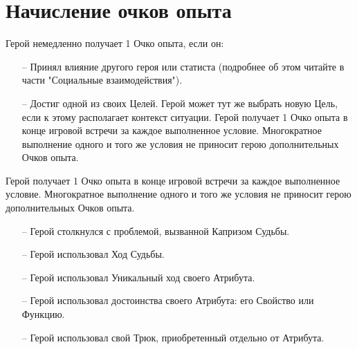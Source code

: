 \section{Начисление очков опыта}
Герой немедленно получает 1 Очко опыта, если он:
\begin{itemize}
\item[--] Принял влияние другого героя или статиста (подробнее об этом читайте в части "Социальные взаимодействия").
\item[--] Достиг одной из своих Целей. Герой может тут же выбрать новую Цель, если к этому располагает контекст ситуации. Герой получает 1 Очко опыта в конце игровой встречи за каждое выполненное условие. Многократное выполнение одного и того же условия не приносит герою дополнительных Очков опыта.
\end{itemize}
Герой получает 1 Очко опыта в конце игровой встречи за каждое
выполненное условие. Многократное выполнение одного и того же
условия не приносит герою дополнительных Очков опыта.
\begin{itemize}
\item[--] Герой столкнулся с проблемой, вызванной Капризом Судьбы.
\item[--] Герой использовал Ход Судьбы.
\item[--] Герой использовал Уникальный ход своего Атрибута.
\item[--] Герой использовал достоинства своего Атрибута: его Свойство или Функцию.
\item[--] Герой использовал свой Трюк, приобретенный отдельно от Атрибута.
\end{itemize}

